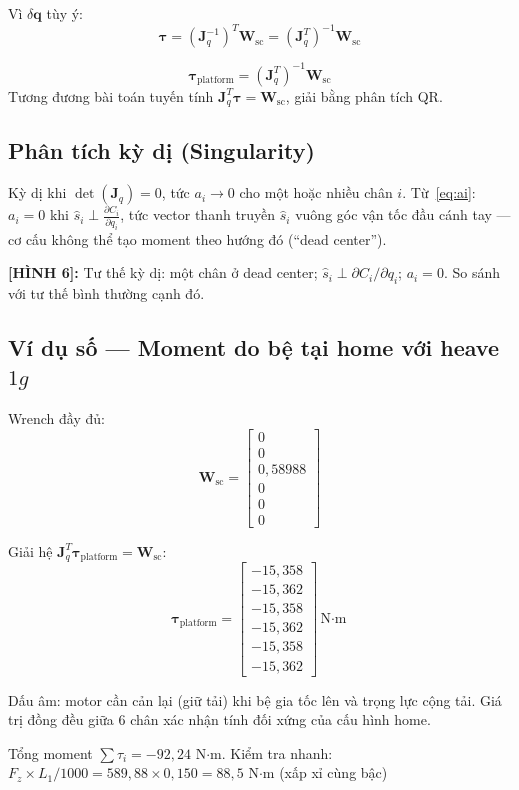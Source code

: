 \documentclass[12pt,a4paper]{article}
\newcommand{\figref}[2]{%
  \begin{mdframed}[
    linecolor=blue!50, linewidth=1pt,
    backgroundcolor=blue!3,
    innerleftmargin=6pt, innerrightmargin=6pt,
    innertopmargin=4pt, innerbottommargin=4pt
  ]
  {\small\bfseries [H\`{I}NH #1]:} {\small #2}
  \end{mdframed}
}
\newcommand{\Jq}{\mathbf{J}_q}
\newcommand{\tauv}{\boldsymbol{\tau}}
\newcommand{\Wsc}{\mathbf{W}_{\mathrm{sc}}}
\newcommand{\shat}{\hat{s}}
\begin{document}
Vì $\delta\mathbf{q}$ tùy ý:
\begin{equation}
  \tauv = (\Jq^{-1})^T\Wsc = (\Jq^T)^{-1}\Wsc
\end{equation}

\begin{resultbox}[frametitle={Moment từ Công ảo}]
\begin{equation}
  \boxed{\tauv_{\text{platform}} = (\Jq^T)^{-1}\Wsc}
  \label{eq:tau_pvw}
\end{equation}
Tương đương bài toán tuyến tính $\Jq^T\tauv = \Wsc$, giải bằng phân tích QR.
\end{resultbox}

\subsection{Phân tích kỳ dị (Singularity)}

Kỳ dị khi $\det(\Jq) = 0$, tức $a_i \to 0$ cho một hoặc nhiều chân $i$.
Từ~\eqref{eq:ai}: $a_i = 0$ khi $\shat_i \perp \frac{\partial C_i}{\partial q_i}$,
tức vector thanh truyền $\shat_i$ vuông góc vận tốc đầu cánh tay --- cơ cấu không
thể tạo moment theo hướng đó (``dead center'').

\figref{6}{Tư thế kỳ dị: một chân ở dead center; $\shat_i\perp\partial C_i/\partial q_i$;
$a_i = 0$. So sánh với tư thế bình thường cạnh đó.}

\subsection{Ví dụ số --- Moment do bệ tại home với heave $1g$}

\begin{numbox}[frametitle={Tính $\tau_{\text{platform}}$: Heave $a_z{=}+1g$; home; MATLAB}]

Wrench đầy đủ:
\[
  \Wsc = \begin{bmatrix}0\\0\\0{,}58988\\0\\0\\0\end{bmatrix}
\]

Giải hệ $\Jq^T\tauv_{\text{platform}} = \Wsc$:
\[
  \tauv_{\text{platform}} = \begin{bmatrix}-15{,}358\\-15{,}362\\-15{,}358\\-15{,}362\\-15{,}358\\-15{,}362\end{bmatrix}\text{N$\cdot$m}
\]

Dấu âm: motor cần cản lại (giữ tải) khi bệ gia tốc lên và trọng lực cộng tải.
Giá trị đồng đều giữa 6 chân xác nhận tính đối xứng của cấu hình home.

Tổng moment $\sum \tau_i = -92{,}24$ N$\cdot$m. Kiểm tra nhanh:
$F_z\times L_1/1000 = 589{,}88\times0{,}150 = 88{,}5$ N$\cdot$m (xấp xỉ cùng bậc) \checkmark{}
\end{numbox}
\end{document}
